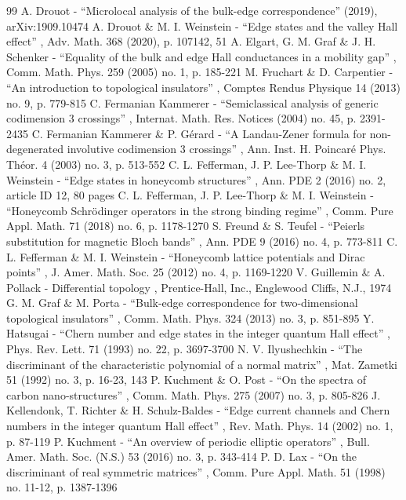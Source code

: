 \documentclass[11pt]{article}
\numberwithin{equation}{section}
\theoremstyle{definition}
\begin{document}
\begin{thebibliography}{99}
 A. Drouot - “Microlocal analysis of the bulk-edge correspondence” (2019), arXiv:1909.10474
 A. Drouot \& M. I. Weinstein - “Edge states and the valley Hall effect” , Adv. Math. 368 (2020), p. 107142, 51
 A. Elgart, G. M. Graf \& J. H. Schenker - “Equality of the bulk and edge Hall conductances in a mobility gap” , Comm. Math. Phys. 259 (2005) no. 1, p. 185-221
 M. Fruchart \& D. Carpentier - “An introduction to topological insulators” , Comptes Rendus Physique 14 (2013) no. 9, p. 779-815
 C. Fermanian Kammerer - “Semiclassical analysis of generic codimension 3 crossings” , Internat. Math. Res. Notices (2004) no. 45, p. 2391-2435
 C. Fermanian Kammerer \& P. Gérard - “A Landau-Zener formula for non-degenerated involutive codimension 3 crossings” , Ann. Inst. H. Poincaré Phys. Théor. 4 (2003) no. 3, p. 513-552
 C. L. Fefferman, J. P. Lee-Thorp \& M. I. Weinstein - “Edge states in honeycomb structures” , Ann. PDE 2 (2016) no. 2, article ID 12, 80 pages
 C. L. Fefferman, J. P. Lee-Thorp \& M. I. Weinstein - “Honeycomb Schrödinger operators in the strong binding regime” , Comm. Pure Appl. Math. 71 (2018) no. 6, p. 1178-1270
 S. Freund \& S. Teufel - “Peierls substitution for magnetic Bloch bands” , Ann. PDE 9 (2016) no. 4, p. 773-811
 C. L. Fefferman \& M. I. Weinstein - “Honeycomb lattice potentials and Dirac points” , J. Amer. Math. Soc. 25 (2012) no. 4, p. 1169-1220
 V. Guillemin \& A. Pollack - Differential topology , Prentice-Hall, Inc., Englewood Cliffs, N.J., 1974
 G. M. Graf \& M. Porta - “Bulk-edge correspondence for two-dimensional topological insulators” , Comm. Math. Phys. 324 (2013) no. 3, p. 851-895
 Y. Hatsugai - “Chern number and edge states in the integer quantum Hall effect” , Phys. Rev. Lett. 71 (1993) no. 22, p. 3697-3700
 N. V. Ilyushechkin - “The discriminant of the characteristic polynomial of a normal matrix” , Mat. Zametki 51 (1992) no. 3, p. 16-23, 143
 P. Kuchment \& O. Post - “On the spectra of carbon nano-structures” , Comm. Math. Phys. 275 (2007) no. 3, p. 805-826
 J. Kellendonk, T. Richter \& H. Schulz-Baldes - “Edge current channels and Chern numbers in the integer quantum Hall effect” , Rev. Math. Phys. 14 (2002) no. 1, p. 87-119
 P. Kuchment - “An overview of periodic elliptic operators” , Bull. Amer. Math. Soc. (N.S.) 53 (2016) no. 3, p. 343-414
 P. D. Lax - “On the discriminant of real symmetric matrices” , Comm. Pure Appl. Math. 51 (1998) no. 11-12, p. 1387-1396

\end{thebibliography}
\end{document}
